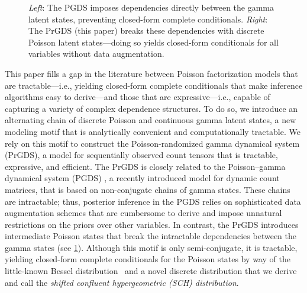 \documentclass{article}
\begin{document}
\begin{figure}[t]
\centering
{}\hfill
%
\caption{\label{fig:comparison} \footnotesize \emph{Left}: The PGDS imposes dependencies directly between the gamma latent states, preventing closed-form complete conditionals. \emph{Right}: The PrGDS (this paper) breaks these dependencies with discrete Poisson latent states---doing so yields closed-form conditionals for all variables without data augmentation.~}%
\end{figure}

This paper fills a gap in the literature between Poisson factorization models that are tractable---i.e., yielding closed-form complete conditionals that make inference algorithms easy to derive---and those that are expressive---i.e., capable of capturing a variety of complex dependence structures. To do so, we introduce an alternating chain of discrete Poisson and continuous gamma latent states, a new modeling motif that is analytically convenient and computationally tractable. We rely on this motif to construct the Poisson-randomized gamma dynamical system (PrGDS), a model for sequentially observed count tensors that is tractable, expressive, and efficient. The PrGDS is closely related to the Poisson--gamma dynamical system (PGDS) \cite{schein2016poisson}, a recently introduced model for dynamic count matrices, that is based on non-conjugate chains of gamma states. These chains are intractable; thus, posterior inference in the PGDS relies on sophisticated data augmentation schemes that are cumbersome to derive and impose unnatural restrictions on the priors over other variables. In contrast, the PrGDS introduces intermediate Poisson states that break the intractable dependencies between the gamma states (see \cref{fig:comparison}). Although this motif is only semi-conjugate, it is tractable, yielding closed-form complete conditionals for the Poisson states by way of the little-known Bessel distribution~\cite{yuan2000bessel} and a novel discrete distribution that we derive and call the \emph{shifted confluent hypergeometric (SCH) distribution}.~
\end{document}
